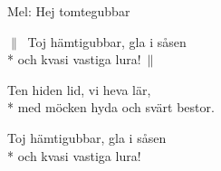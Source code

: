 \begin{SongText}
    \begin{SongInfo}
        Mel: Hej tomtegubbar
    \end{SongInfo}
    \begin{SongVerse}
        $\|\:$ Toj hämtigubbar, gla i såsen\\*%
        och kvasi vastiga lura!$\:\|$
    \end{SongVerse}
    \begin{SongVerse}
        Ten hiden lid, vi heva lär,\\*%
        med möcken hyda och svärt bestor.
    \end{SongVerse}
    \begin{SongVerse}
        Toj hämtigubbar, gla i såsen\\*%
        och kvasi vastiga lura!
    \end{SongVerse}
\end{SongText}
